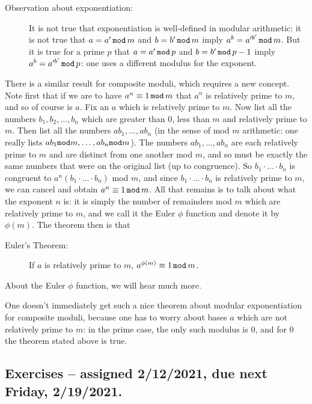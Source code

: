 \documentclass[12pt]{article}
\begin{document}
\begin{description}
\item[Observation about exponentiation:]  It is not true that exponentiation is well-defined in modular arithmetic:  it is not true that $a=a'\,{\tt mod}\,m$
and $b=b'\,{\tt mod}\,m$ imply $a^b=a'^{b'}\,{\tt mod}\,m$.  But it is true for a prime $p$ that $a=a'\,{\tt mod}\,p$
and $b=b'\,{\tt mod}\,p-1$ imply $a^b=a'^{b'}\,{\tt mod}\,p$:  one uses a different modulus for the exponent.

\end{description}

There is a similar result for composite moduli, which requires a new concept.  Note first that if we are to have $a^n\equiv 1 \,{\tt mod}\,m$
that $a^n$ is relatively prime to $m$, and so of course is $a$.   Fix an $a$ which is relatively prime to $m$.   Now list all the numbers $b_1,b_2,\ldots,b_n$ which
are greater than 0, less than $m$ and relatively prime to $m$.  Then list all the numbers $ab_1,\ldots,ab_n$ (in the sense of mod $m$ arithmetic:  one really lists  $ab_1{\tt mod}m,\ldots,ab_n{\tt mod}m$).
The numbers $ab_1,\ldots,ab_n$ are each relatively prime to $m$ and are distinct from one another mod $m$,
and so must be exactly the same numbers that were on the original list (up to congruence).   So $b_1\cdot \ldots \cdot b_n$ is congruent to
$a^n(b_1\cdot \ldots \cdot b_n)$ mod $m$, and since $b_1\cdot \ldots \cdot b_n$ is relatively prime to $m$,
we can cancel and obtain $a^n \equiv 1\,{\tt mod}\,m$.   All that remains is to talk about what the exponent $n$ is:
it is simply the number of remainders mod $m$ which are relatively prime to $m$, and we call it the Euler $\phi$ function
and denote it by $\phi(m)$.  The theorem then is that


\begin{description}

 \item[Euler's Theorem:]  If $a$ is relatively prime to $m$, $a^{\phi(m)}\equiv 1\,{\tt mod}\,m$.

\end{description}

About the Euler $\phi$ function, we will hear much more.

One doesn't immediately get such a nice theorem about modular exponentiation for composite moduli, because one has to worry about bases $a$ which
are not relatively prime to $m$:  in the prime case, the only such modulus is 0, and for 0 the theorem stated above is true.

\subsection{Exercises -- assigned 2/12/2021, due next Friday, 2/19/2021.}
\end{document}
